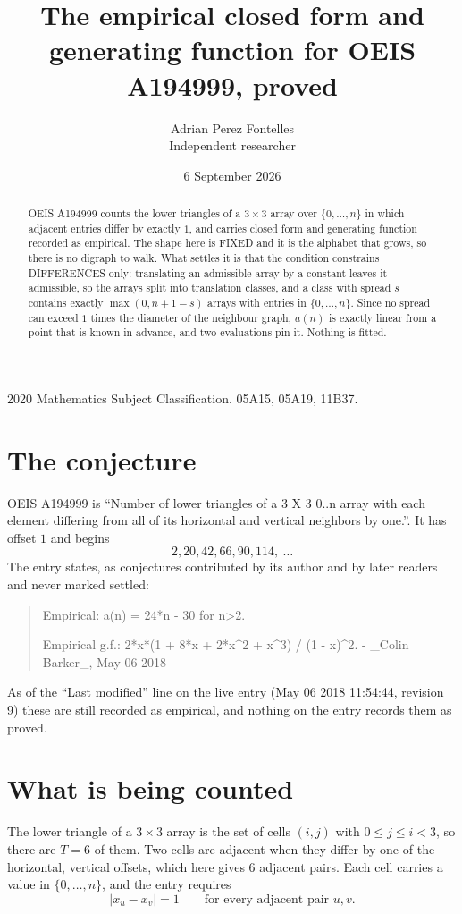 \documentclass[11pt,a4paper]{article}
\title{The empirical closed form and generating function for OEIS A194999, proved}
\author{Adrian Perez Fontelles\\ \small Independent researcher}
\date{6 September 2026}
\theoremstyle{plain}
\theoremstyle{definition}
\begin{document}
\maketitle

\begin{abstract}
OEIS A194999 counts the lower triangles of a $3\times3$ array over $\{0,\dots,n\}$ in which
adjacent entries differ by exactly $1$, and carries closed form and generating function recorded as empirical. The shape here is FIXED
and it is the alphabet that grows, so there is no digraph to walk. What settles it is that the
condition constrains DIFFERENCES only: translating an admissible array by a constant leaves it
admissible, so the arrays split into translation classes, and a class with spread $s$ contains
exactly $\max(0,n+1-s)$ arrays with entries in $\{0,\dots,n\}$. Since no spread can exceed
$1$ times the diameter of the neighbour graph, $a(n)$ is exactly linear from a point that is
known in advance, and two evaluations pin it. Nothing is fitted.
\end{abstract}

\noindent\small 2020 Mathematics Subject Classification. 05A15, 05A19, 11B37.\normalsize

\section{The conjecture}

OEIS A194999 is ``Number of lower triangles of a 3 X 3 0..n array with each element differing from all of its horizontal and vertical neighbors by one.''. It has offset $1$ and begins
\[
2, 20, 42, 66, 90, 114,\ \dots
\]
The entry states, as conjectures contributed by its author and by later readers and never
marked settled:
\begin{quote}
Empirical: a(n) = 24*n - 30 for n>2.

Empirical g.f.: 2*x*(1 + 8*x + 2*x\^{}2 + x\^{}3) / (1 - x)\^{}2. - \_Colin Barker\_, May 06 2018
\end{quote}
As of the ``Last modified'' line on the live entry (May 06 2018 11:54:44, revision 9) these are still
recorded as empirical, and nothing on the entry records them as proved.

\section{What is being counted}

The lower triangle of a $3\times3$ array is the set of cells $(i,j)$ with $0\le j\le
i<3$, so there are $T=6$ of them. Two cells are adjacent when they differ by one of the
horizontal, vertical offsets, which here gives $6$ adjacent pairs. Each cell carries a value in
$\{0,\dots,n\}$, and the entry requires
\[
|x_u-x_v|=1\qquad\text{for every adjacent pair }u,v .
\]
\end{document}
